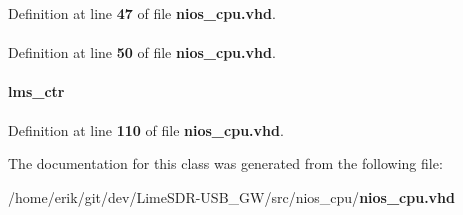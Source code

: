 Definition at line {\bf 47} of file {\bf nios\+\_\+cpu.\+vhd}.

\paragraph[{lms\+\_\+ctr}]{ {\bfseries \textcolor{vhdlchar}{ }} \hspace{0.3cm}{\ttfamily [Component]}}\label{classnios__cpu_1_1arch_a7814224799d00b363691107c2a254aae}


Definition at line {\bf 50} of file {\bf nios\+\_\+cpu.\+vhd}.

\paragraph[{u0}]{ {\bfseries \textcolor{vhdlchar}{lms\+\_\+ctr}\textcolor{vhdlchar}{ }} \hspace{0.3cm}{\ttfamily [Instantiation]}}\label{classnios__cpu_1_1arch_ae060ce5868d35ef17bcb6e832da03be9}


Definition at line {\bf 110} of file {\bf nios\+\_\+cpu.\+vhd}.



The documentation for this class was generated from the following file\+:\begin{DoxyCompactItemize}
\item 
/home/erik/git/dev/\+Lime\+S\+D\+R-\/\+U\+S\+B\+\_\+\+G\+W/src/nios\+\_\+cpu/{\bf nios\+\_\+cpu.\+vhd}\end{DoxyCompactItemize}
